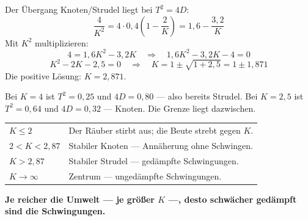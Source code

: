 \begin{aufgabe}
Der Übergang Knoten/Strudel liegt bei $T^2 = 4D$:
\[ \frac{4}{K^2} = 4 \cdot 0{,}4\left(1-\frac{2}{K}\right) = 1{,}6 - \frac{3{,}2}{K} \]
Mit $K^2$ multiplizieren:
\[ 4 = 1{,}6K^2 - 3{,}2K \quad\Longrightarrow\quad 1{,}6K^2 - 3{,}2K - 4 = 0 \]
\[ K^2 - 2K - 2{,}5 = 0 \quad\Longrightarrow\quad K = 1 \pm \sqrt{1+2{,}5} = 1 \pm 1{,}871 \]
Die positive Lösung: $K = 2{,}871$.

 Bei $K=4$ ist $T^2 = 0{,}25$ und $4D = 0{,}80$ --- also bereits Strudel. Bei $K=2{,}5$ ist $T^2=0{,}64$ und $4D=0{,}32$ --- Knoten. Die Grenze liegt dazwischen. \checkmark

\begin{center}
{\small
\renewcommand{\arraystretch}{1.48}
\begin{tabular}{@{}P{2.6cm}P{5.8cm}@{}}
\toprule
$K \le 2$ & Der Räuber stirbt aus; die Beute strebt gegen $K$.\\
$2 < K < 2{,}87$ & Stabiler Knoten --- Annäherung ohne Schwingen.\\
$K > 2{,}87$ & Stabiler Strudel --- gedämpfte Schwingungen.\\
$K \to \infty$ & Zentrum --- ungedämpfte Schwingungen.\\
\bottomrule
\end{tabular}}
\end{center}

\begin{center}
\begin{minipage}{0.9\textwidth}
\textbf{Je reicher die Umwelt --- je größer $K$ ---, desto schwächer gedämpft sind die Schwingungen.}
\end{minipage}
\end{center}

\begin{center}
\begin{minipage}{0.88\textwidth}
\end{minipage}
\end{center}
\end{aufgabe}

